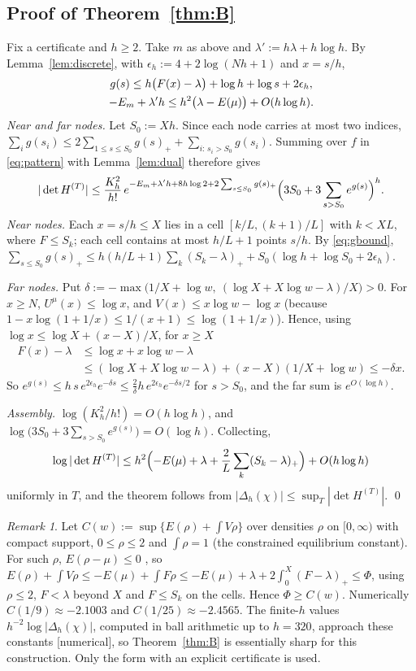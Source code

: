 \documentclass[11pt]{amsart}
\theoremstyle{definition}
\theoremstyle{remark}
\newtheorem{remark}[theorem]{Remark}
\numberwithin{equation}{section}
\begin{document}
\subsection{Proof of Theorem~\ref{thm:B}}
Fix a certificate and $h\ge2$. Take $m$ as above and $\lambda':=h\lambda+h\log h$. By Lemma~\ref{lem:discrete}, with
$\epsilon_h:=4+2\log(Nh+1)$ and $x=s/h$,
\begin{gather}
  g(s)\le h\bigl(F(x)-\lambda\bigr)+\log h+\log s+2\epsilon_h,\label{eq:gbound}\\
  -E_m+\lambda'h\le h^2\bigl(\lambda-E(\mu)\bigr)+O(h\log h).\notag
\end{gather}
\emph{Near and far nodes.} Let $S_0:=Xh$. Since each node carries at most two indices,
$\sum_ig(s_i)\le2\sum_{1\le s\le S_0}g(s)_++\sum_{i:\,s_i>S_0}g(s_i)$. Summing over $f$ in \eqref{eq:pattern} with
Lemma~\ref{lem:dual} therefore gives
\[
  |\det H^{(T)}|\le\frac{K_h^2}{h!}\,e^{-E_m+\lambda'h+8h\log2+2\sum_{s\le S_0}g(s)_+}\Bigl(3S_0+3\sum_{s>S_0}e^{g(s)}\Bigr)^h .
\]
\emph{Near nodes.} Each $x=s/h\le X$ lies in a cell $[k/L,(k+1)/L]$ with $k<XL$, where $F\le S_k$; each cell contains at
most $h/L+1$ points $s/h$. By \eqref{eq:gbound},
$\sum_{s\le S_0}g(s)_+\le h(h/L+1)\sum_k(S_k-\lambda)_++S_0(\log h+\log S_0+2\epsilon_h)$.

\emph{Far nodes.} Put $\delta:=-\max\bigl(1/X+\log w,\ (\log X+X\log w-\lambda)/X\bigr)>0$. For $x\ge N$,
$U^\mu(x)\le\log x$, and $V(x)\le x\log w-\log x$ (because $1-x\log(1+1/x)\le1/(x+1)\le\log(1+1/x)$). Hence, using
$\log x\le\log X+(x-X)/X$, for $x\ge X$
\begin{align*}
  F(x)-\lambda&\le\log x+x\log w-\lambda\\
  &\le(\log X+X\log w-\lambda)+(x-X)(1/X+\log w)\le-\delta x .
\end{align*}
So $e^{g(s)}\le h\,s\,e^{2\epsilon_h}e^{-\delta s}\le\frac2\delta h\,e^{2\epsilon_h}e^{-\delta s/2}$ for $s>S_0$, and the
far sum is $e^{O(\log h)}$.

\emph{Assembly.} $\log(K_h^2/h!)=O(h\log h)$, and $\log\bigl(3S_0+3\sum_{s>S_0}e^{g(s)}\bigr)=O(\log h)$. Collecting,
\[
  \log|\det H^{(T)}|\le h^2\Bigl(-E(\mu)+\lambda+\frac2L\sum_k(S_k-\lambda)_+\Bigr)+O(h\log h)
\]
uniformly in $T$, and the theorem follows from $|\Delta_h(\chi)|\le\sup_T|\det H^{(T)}|$. \qed

\begin{remark}
Let $C(w):=\sup\{E(\rho)+\int V\rho\}$ over densities $\rho$ on $[0,\infty)$ with compact support, $0\le\rho\le2$ and
$\int\rho=1$ (the constrained equilibrium constant). For such $\rho$, $E(\rho-\mu)\le0$ \cite[Lemma~I.1.8]{SaffTotik},
so $E(\rho)+\int V\rho\le-E(\mu)+\int F\rho\le-E(\mu)+\lambda+2\int_0^X(F-\lambda)_+\le\Phi$, using $\rho\le2$, $F<\lambda$
beyond $X$ and $F\le S_k$ on the cells. Hence
$\Phi\ge C(w)$. Numerically $C(1/9)\approx-2.1003$ and
$C(1/25)\approx-2.4565$. The finite-$h$ values $h^{-2}\log|\Delta_h(\chi)|$, computed in ball arithmetic up to $h=320$,
approach these constants [numerical], so Theorem~\ref{thm:B} is essentially sharp for this construction. Only the
form with an explicit certificate is used.
\end{remark}
\end{document}
